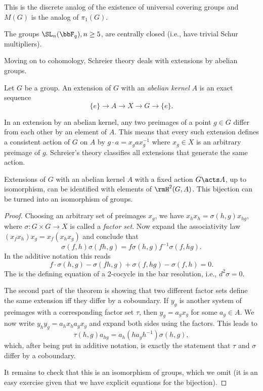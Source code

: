 This is the discrete analog of the existence of universal covering groups and $M(G)$ is the analog of $\pi_1(G)$.

\begin{thm}[Schur]
    The groups $\SL_n(\bbF_q),n\geq 5$, are centrally closed (i.e., have trivial Schur multipliers).
\end{thm}

Moving on to cohomology, Schreier theory deals with extensions by abelian groups.

\begin{defn}
    Let $G$ be a group. An extension of $G$ with an \emph{abelian kernel} $A$ is an exact sequence
    \[\{e\}\to A\to X\to G\to \{e\}.\]
\end{defn}

In an extension by an abelian kernel, any two preimages of a point $g\in G$ differ from each other by an element of $A$. This means that every such extension defines a consistent action of $G$ on $A$ by $g\cdot a=x_g ax_g^{-1}$ where $x_g\in X$ is an arbitrary preimage of $g$. Schreier's theory classifies all extensions that generate the same action.

\begin{thm}[Schreier]
    Extensions of $G$ with an abelian kernel $A$ with a fixed action $G\acts A$, up to isomorphism, can be identified with elements of $\rmH^2(G,A)$. This bijection can be turned into an isomorphism of groups.
\end{thm}
\begin{proof}
    Choosing an arbitrary set of preimages $x_g$, we have $x_hx_h=\sigma(h,g)x_{hg}$, where $\sigma:G\times G\to X$ is called a \emph{factor set}. Now expand the associativity law $(x_fx_h)x_g=x_f(x_hx_g)$ and conclude that 
    \[\sigma(f,h)\sigma(fh,g)=f\sigma(h,g)f^{-1}\sigma(f,hg).\]
    In the additive notation this reads
    \[f\cdot\sigma(h,g)-\sigma(fh,g)+\sigma(f,hg)-\sigma(f,h)=0.\]
    The is the defining equation of a 2-cocycle in the bar resolution, i.e., $d^2\sigma=0$.

    The second part of the theorem is showing that two different factor sets define the same extension iff they differ by a coboundary. If $y_g$ is another system of preimages with a corresponding factor set $\tau$, then $y_g=a_gx_g$ for some $a_g\in A$. We now write $y_hy_g=a_hx_ha_gx_g$ and expand both sides using the factors. This leads to
    \[\tau(h,g)a_{hg}=a_h (ha_gh^{-1})\sigma(h,g),\]
    which, after being put in additive notation, is exactly the statement that $\tau$ and $\sigma$ differ by a coboundary.

    It remains to check that this is an isomorphism of groups, which we omit (it is an easy exercise given that we have explicit equations for the bijection).
\end{proof}

